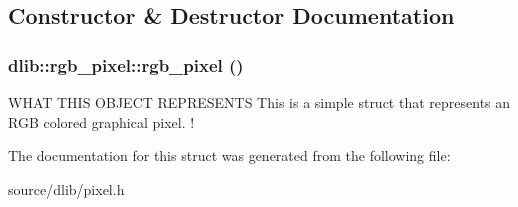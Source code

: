 \subsection{Constructor \& Destructor Documentation}
\hypertarget{structdlib_1_1rgb__pixel_afa497c6467591efaeef930a7a629e704}{
\subsubsection[{rgb\_\-pixel}]{\setlength{\rightskip}{0pt plus 5cm}dlib::rgb\_\-pixel::rgb\_\-pixel ()}}
\label{structdlib_1_1rgb__pixel_afa497c6467591efaeef930a7a629e704}
WHAT THIS OBJECT REPRESENTS This is a simple struct that represents an RGB colored graphical pixel. ! 

The documentation for this struct was generated from the following file:\begin{DoxyCompactItemize}
\item 
source/dlib/pixel.h\end{DoxyCompactItemize}
